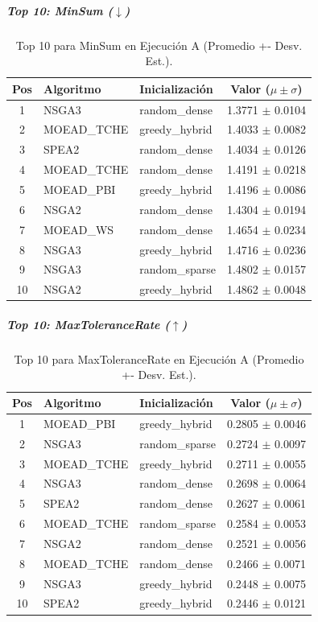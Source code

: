 \documentclass[a4paper,10pt]{article}
\begin{document}
\subparagraph{Top 10: MinSum ($\downarrow$)}
\begin{table}[H]
    \centering
    \begin{tabular}{cllc}
        \toprule
        Pos & Algoritmo & Inicialización & Valor ($\mu \pm \sigma$) \\
        \midrule
        1 & NSGA3 & random\_dense & 1.3771 $\pm$ 0.0104 \\
        2 & MOEAD\_TCHE & greedy\_hybrid & 1.4033 $\pm$ 0.0082 \\
        3 & SPEA2 & random\_dense & 1.4034 $\pm$ 0.0126 \\
        4 & MOEAD\_TCHE & random\_dense & 1.4191 $\pm$ 0.0218 \\
        5 & MOEAD\_PBI & greedy\_hybrid & 1.4196 $\pm$ 0.0086 \\
        6 & NSGA2 & random\_dense & 1.4304 $\pm$ 0.0194 \\
        7 & MOEAD\_WS & random\_dense & 1.4654 $\pm$ 0.0234 \\
        8 & NSGA3 & greedy\_hybrid & 1.4716 $\pm$ 0.0236 \\
        9 & NSGA3 & random\_sparse & 1.4802 $\pm$ 0.0157 \\
        10 & NSGA2 & greedy\_hybrid & 1.4862 $\pm$ 0.0048 \\
        \bottomrule
    \end{tabular}
    \caption{Top 10 para MinSum en Ejecución A (Promedio +- Desv. Est.).}
\end{table}

\subparagraph{Top 10: MaxToleranceRate ($\uparrow$)}
\begin{table}[H]
    \centering
    \begin{tabular}{cllc}
        \toprule
        Pos & Algoritmo & Inicialización & Valor ($\mu \pm \sigma$) \\
        \midrule
        1 & MOEAD\_PBI & greedy\_hybrid & 0.2805 $\pm$ 0.0046 \\
        2 & NSGA3 & random\_sparse & 0.2724 $\pm$ 0.0097 \\
        3 & MOEAD\_TCHE & greedy\_hybrid & 0.2711 $\pm$ 0.0055 \\
        4 & NSGA3 & random\_dense & 0.2698 $\pm$ 0.0064 \\
        5 & SPEA2 & random\_dense & 0.2627 $\pm$ 0.0061 \\
        6 & MOEAD\_TCHE & random\_sparse & 0.2584 $\pm$ 0.0053 \\
        7 & NSGA2 & random\_dense & 0.2521 $\pm$ 0.0056 \\
        8 & MOEAD\_TCHE & random\_dense & 0.2466 $\pm$ 0.0071 \\
        9 & NSGA3 & greedy\_hybrid & 0.2448 $\pm$ 0.0075 \\
        10 & SPEA2 & greedy\_hybrid & 0.2446 $\pm$ 0.0121 \\
        \bottomrule
    \end{tabular}
    \caption{Top 10 para MaxToleranceRate en Ejecución A (Promedio +- Desv. Est.).}
\end{table}
\end{document}
